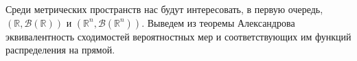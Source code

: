
Среди метрических пространств нас будут интересовать, в первую очередь, $(\mathbb{R}, \mathcal{B}(\mathbb{R}))$ и $(\mathbb{R}^n, \mathcal{B}(\mathbb{R}^{n}))$. Выведем из теоремы Александрова эквивалентность сходимостей вероятностных мер и соответствующих им функций распределения на прямой.


